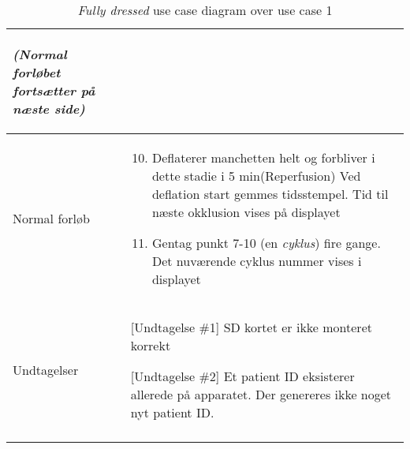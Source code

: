 \begin{center}
\begin{longtable}{ | p{} | p{}| }
\begin{enumerate}
				\textit{(Normal forløbet fortsætter på næste side)}
			\end{enumerate} \\ 
			\hline
			Normal forløb & \begin{enumerate}
				\setcounter{enumi}{9}		
				\item Deflaterer manchetten helt og forbliver i dette stadie i 5 min(Reperfusion) Ved deflation start gemmes tidsstempel. Tid til næste okklusion vises på displayet
				\item Gentag punkt 7-10 (en \textit{cyklus}) fire gange. Det nuværende cyklus nummer vises i displayet
			\end{enumerate} \\ 
			\hline
			Undtagelser & [Undtagelse \#1] SD kortet er ikke monteret korrekt
			
			[Undtagelse \#2] Et patient ID eksisterer allerede på apparatet. Der genereres ikke noget nyt patient ID. \\
			\hline
			\caption{\textit{Fully dressed} use case diagram over use case 1} \label{tab:uc1}
		\end{longtable}
		
	\end{center}